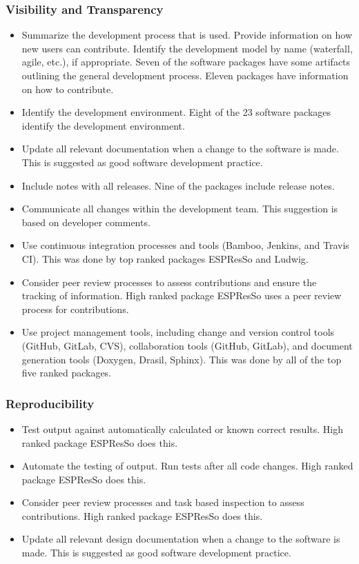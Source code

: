 \documentclass[final, 3p, times, authoryear]{elsarticle}
\begin{document}
\subsubsection{Visibility and Transparency}

\begin{itemize}
	\item Summarize the development process that is used. Provide information on
	how new users can contribute. Identify the development model by name
	(waterfall, agile, etc.), if appropriate.  Seven of the software packages
	have some artifacts outlining the general development process. Eleven
	packages have information on how to contribute. 
	\item Identify the development environment. Eight of the 23 software
	packages identify the development environment.
	\item Update all relevant documentation when a change to the software is
	made. This is suggested as good software development practice.
	\item Include notes with all releases. Nine of the packages include release notes.
	\item Communicate all changes within the development team. This suggestion
	is based on developer comments.
	\item Use continuous integration processes and tools (Bamboo, Jenkins, and
	Travis CI). This was done by top ranked packages ESPResSo and Ludwig.
	\item Consider peer review processes to assess contributions and ensure the
	tracking of information. High ranked package ESPResSo uses a peer review
	process for contributions. 
	\item Use project management tools, including change and version control
	tools (GitHub, GitLab, CVS), collaboration tools (GitHub, GitLab), and
	document generation tools (Doxygen, Drasil, Sphinx). This was done by all of
	the top five ranked packages. 
\end{itemize}

\subsubsection{Reproducibility}

\begin{itemize}
	\item Test output against automatically calculated or known correct results.
	High ranked package ESPResSo does this.
	\item Automate the testing of output. Run tests after all code changes. High
	ranked package ESPResSo does this.
	\item Consider peer review processes and task based inspection to assess
	contributions. High ranked package ESPResSo does this.
	\item Update all relevant design documentation when a change to the software
	is made. This is suggested as good software development practice.
\end{itemize}
\end{document}
